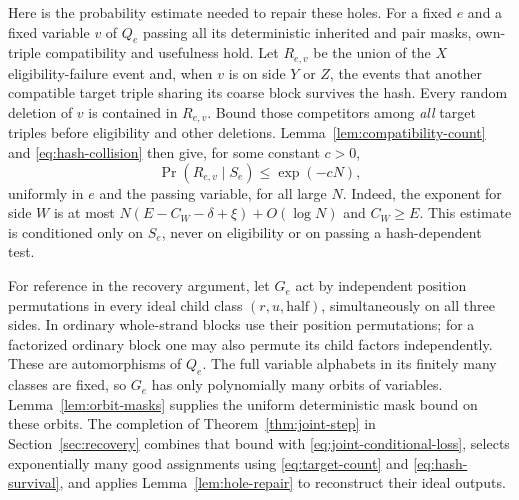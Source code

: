 Here is the probability estimate needed to repair these holes.
For a fixed $e$ and a fixed variable $v$ of $Q_e$ passing all its
deterministic inherited and pair masks, own-triple compatibility
and usefulness hold.  Let $R_{e,v}$ be the union of the $X$
eligibility-failure event and, when $v$ is on side $Y$ or $Z$,
the events that another compatible target triple sharing its
coarse block survives the hash.  Every random deletion of $v$ is
contained in $R_{e,v}$.  Bound those competitors among
\emph{all} target triples before eligibility and other deletions.
Lemma~\ref{lem:compatibility-count} and
\eqref{eq:hash-collision} then give, for some constant $c>0$,
\begin{equation}\label{eq:joint-conditional-loss}
 \Pr(R_{e,v}\mid S_e)
 \le \exp(-cN),
\end{equation}
uniformly in $e$ and the passing variable, for all large $N$.
Indeed, the exponent for side $W$ is at most
$N(E-C_W-\delta+\xi)+O(\log N)$ and $C_W\ge E$.
This estimate is conditioned only on $S_e$, never on eligibility
or on passing a hash-dependent test.

For reference in the recovery argument, let $G_e$ act by independent
position permutations in every ideal child class $(r,u,\text{half})$,
simultaneously on all three sides.  In ordinary whole-strand blocks
use their position permutations; for a factorized ordinary block
one may also permute its child factors independently.  These are
automorphisms of $Q_e$.  The full variable alphabets in its finitely
many classes are fixed, so $G_e$ has only polynomially many orbits
of variables.  Lemma~\ref{lem:orbit-masks} supplies the uniform
deterministic mask bound on these orbits.  The completion of
Theorem~\ref{thm:joint-step} in Section~\ref{sec:recovery} combines
that bound with \eqref{eq:joint-conditional-loss}, selects
exponentially many good assignments using
\eqref{eq:target-count} and \eqref{eq:hash-survival}, and applies
Lemma~\ref{lem:hole-repair} to reconstruct their ideal outputs.
